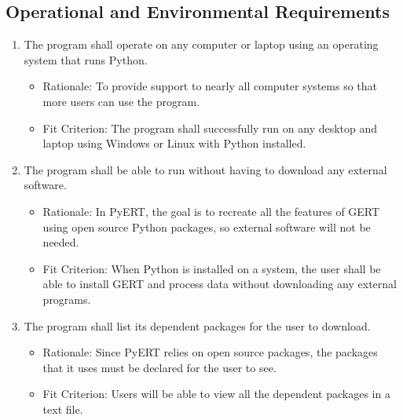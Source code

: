 \documentclass[12pt, titlepage]{article}
\begin{document}
\subsection{Operational and Environmental Requirements}
\begin{enumerate}[{OE}1. ]
\item \label{OE1} The program shall operate on any computer or laptop using an operating system that runs Python.
    \begin{itemize}  
        \item Rationale: To provide support to nearly all computer systems so that more users can use the program.
        \item Fit Criterion: The program shall successfully run on any desktop and laptop using Windows or Linux with Python installed.
    \end{itemize} 

\item \label{OE2} The program shall be able to run without having to download any external software.
    \begin{itemize}  
        \item Rationale: In PyERT, the goal is to recreate all the features of GERT using open source Python packages, so external software will not be needed.
        \item Fit Criterion: When Python is installed on a system, the user shall be able to install GERT and process data without downloading any external programs.
    \end{itemize} 

\item \label{OE3} The program shall list its dependent packages for the user to download.
    \begin{itemize}  
        \item Rationale: Since PyERT relies on open source packages, the packages that it uses must be declared for the user to see.
        \item Fit Criterion: Users will be able to view all the dependent packages in a text file.
    \end{itemize} 
\end{enumerate}
\end{document}
